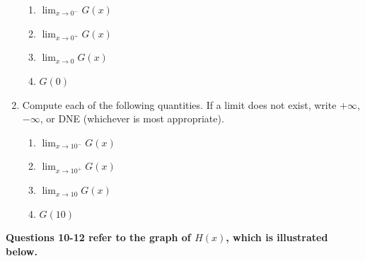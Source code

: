 \documentclass[12pt]{article}
\newif\ifans
\begin{document}
\begin{enumerate}
\begin{enumerate}

\item $\displaystyle \lim_{x \rightarrow 0^{-}}{G(x)}$

\ifans{\fbox{$-4$}} \fi

\item $\displaystyle \lim_{x \rightarrow 0^{+}}{G(x)}$

\ifans{\fbox{$-4$}} \fi

\item $\displaystyle \lim_{x \rightarrow 0}{G(x)}$

\ifans{\fbox{$-4$}} \fi

\item $G(0)$

\ifans{\fbox{$-4$}} \fi

\end{enumerate}

\newpage

\item Compute each of the following quantities.  If a limit does not exist, write $+\infty$, $-\infty$, or DNE (whichever is most appropriate). 

\begin{enumerate}

\item $\displaystyle \lim_{x \rightarrow 10^{-}}{G(x)}$

\ifans{\fbox{$-4$}} \fi

\item $\displaystyle \lim_{x \rightarrow 10^{+}}{G(x)}$

\ifans{\fbox{$4$}} \fi

\item $\displaystyle \lim_{x \rightarrow 10}{G(x)}$

\ifans{\fbox{DNE because $\displaystyle \lim_{x \rightarrow 10^{-}}{G(x)} \neq \lim_{x \rightarrow 10^{+}}{G(x)}$}} \fi

\item $G(10)$

\ifans{\fbox{$-4$}} \fi

\end{enumerate}

\end{enumerate}

{\bf Questions 10-12 refer to the graph of $H(x)$, which is illustrated below.}
\end{document}
